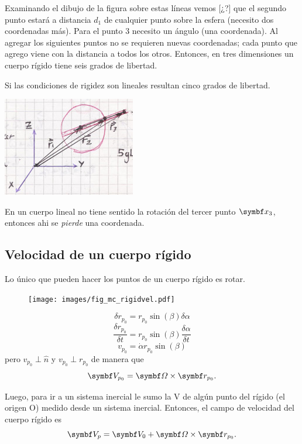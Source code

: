\documentclass[10pt,oneside]{CBFT_book}
\begin{document}
Examinando el dibujo de la figura sobre estas líneas vemos [¿?] que el segundo punto estará a distancia $d_1$ de
cualquier punto sobre la esfera (necesito dos coordenadas más). Para el punto 3 necesito un ángulo (una coordenada).
Al agregar los siguientes puntos no se requieren nuevas coordenadas; cada punto que agrego viene con la distancia a
todos los otros. Entonces, en tres dimensiones un cuerpo rígido tiene seis grados de libertad.

Si las condiciones de rigidez son lineales resultan cinco grados de libertad.

\includegraphics[scale=0.4]{images/fig_mc_rigid_body_7.jpg}

En un cuerpo lineal no tiene sentido la rotación del tercer punto $\vb{x}_3$, entonces ahi se {\it pierde} una
coordenada.


\subsection{Velocidad de un cuerpo rígido}

Lo único que pueden hacer los puntos de un cuerpo rígido es rotar.
\begin{figure}[htb]
	\begin{center}
	\texttt{[image: images/fig\_mc\_rigidvel.pdf]}	 
	\end{center}
	\caption{}
\end{figure} 
\[
	\delta r_{p_0} = r_{p_0} \sin(\beta) \delta \alpha
\]
\[
	\frac{\delta r_{p_0}}{\delta t} = r_{p_0} \sin(\beta) \frac{\delta\alpha}{\delta t}
\]
\[
	v_{p_0} = \dot{\alpha} r_{p_0} \sin(\beta)
\]
pero $v_{p_0} \perp \hat{n}$ y $v_{p_0} \perp r_{p_0}$ de manera que 
\[
	\vb{V}_{p_0} = \vb{\Omega} \times \vb{r}_{p_0}.
\]

Luego, para ir a un sistema inercial le sumo la V de algún punto del rígido (el origen O)
medido desde un sistema inercial. Entonces, el campo de velocidad del cuerpo rígido es
\[
	\vb{V}_{p} = \vb{V}_0 + \vb{\Omega} \times \vb{r}_{p_0}.
\]
\end{document}
